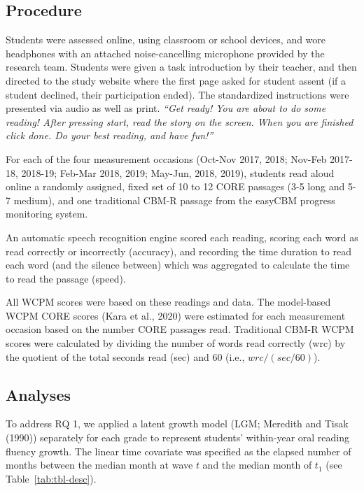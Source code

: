 \documentclass[
  english,
  man, fleqn, noextraspace]{apa6}
\begin{document}
\hypertarget{procedure}{%
\subsection{Procedure}\label{procedure}}

Students were assessed online, using classroom or school devices, and wore headphones with an attached noise-cancelling microphone provided by the research team. Students were given a task introduction by their teacher, and then directed to the study website where the first page asked for student assent (if a student declined, their participation ended). The standardized instructions were presented via audio as well as print. \emph{\enquote{Get ready! You are about to do some reading! After pressing start, read the story on the screen. When you are finished click done. Do your best reading, and have fun!}}

For each of the four measurement occasions (Oct-Nov 2017, 2018; Nov-Feb 2017-18, 2018-19; Feb-Mar 2018, 2019; May-Jun, 2018, 2019), students read aloud online a randomly assigned, fixed set of 10 to 12 CORE passages (3-5 long and 5-7 medium), and one traditional CBM-R passage from the easyCBM progress monitoring system.

An automatic speech recognition engine scored each reading, scoring each word as read correctly or incorrectly (accuracy), and recording the time duration to read each word (and the silence between) which was aggregated to calculate the time to read the passage (speed).

All WCPM scores were based on these readings and data. The model-based WCPM CORE scores (Kara et al., 2020) were estimated for each measurement occasion based on the number CORE passages read. Traditional CBM-R WCPM scores were calculated by dividing the number of words read correctly (wrc) by the quotient of the total seconds read (sec) and 60 (i.e., \(wrc/(sec/60)\)).

\hypertarget{analyses}{%
\subsection{Analyses}\label{analyses}}

To address RQ 1, we applied a latent growth model (LGM; Meredith and Tisak (1990)) separately for each grade to represent students' within-year oral reading fluency growth. The linear time covariate was specified as the elapsed number of months between the median month at wave \(t\) and the median month of \(t_1\) (see Table~\ref{tab:tbl-desc}).
\end{document}
